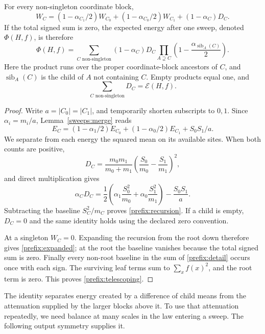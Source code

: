 \begin{lemma}\label{prefix:hierarchy}
For every non-singleton coordinate block,
\begin{equation}\label{prefix:recursion}
 W_C=(1-\alpha_{C_1}/2)W_{C_0}
     +(1-\alpha_{C_0}/2)W_{C_1}+(1-\alpha_C)D_C.
\end{equation}
If the total signed sum is zero, the expected energy after one sweep,
denoted $\Phi(H,f)$, is therefore
\begin{equation}\label{prefix:expanded}
 \Phi(H,f)=\sum_{C\text{ non-singleton}}(1-\alpha_C)D_C
  \prod_{A\supsetneq C}
    \left(1-\frac{\alpha_{\operatorname{sib}_A(C)}}2\right).
\end{equation}
Here the product runs over the proper coordinate-block ancestors of
$C$, and $\operatorname{sib}_A(C)$ is the child of $A$ not containing
$C$.  Empty products equal one, and
\begin{equation}\label{prefix:telescoping}
 \sum_{C\text{ non-singleton}}D_C=\mathcal E(H,f).
\end{equation}
\end{lemma}
\begin{proof}
Write $a=|C_0|=|C_1|$, and temporarily shorten subscripts to $0,1$.
Since $\alpha_i=m_i/a$, Lemma~\ref{sweeps:merge} reads
\[
 E_C=(1-\alpha_1/2)E_{C_0}
       +(1-\alpha_0/2)E_{C_1}+S_0S_1/a.
\]
We separate from each energy the squared mean on its available sites.
When both counts are positive,
\[
 D_C=\frac{m_0m_1}{m_0+m_1}
         \left(\frac{S_0}{m_0}-\frac{S_1}{m_1}\right)^2,
\]
and direct multiplication gives
\[
 \alpha_C D_C=\frac12\left(
       \alpha_1\frac{S_0^2}{m_0}+\alpha_0\frac{S_1^2}{m_1}\right)
       -\frac{S_0S_1}{a}.
\]
Subtracting the baseline $S_C^2/m_C$ proves
\eqref{prefix:recursion}.  If a child is empty, $D_C=0$ and the
same identity holds using the declared zero convention.

At a singleton $W_C=0$.  Expanding the recursion from the root down
therefore gives \eqref{prefix:expanded}; at the root the baseline
vanishes because the total signed sum is zero.  Finally every
non-root baseline in the sum of \eqref{prefix:detail} occurs once
with each sign.  The surviving leaf terms sum to $\sum_xf(x)^2$,
and the root term is zero.  This proves \eqref{prefix:telescoping}.
\end{proof}

The identity separates energy created by a difference of child means
from the attenuation supplied by the larger blocks above it.  To use
that attenuation repeatedly, we need balance at many scales in the
law entering a sweep.  The following output symmetry supplies it.

